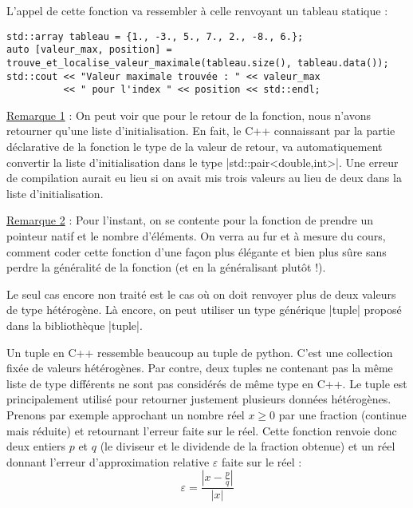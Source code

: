 \begin{itemize}
L'appel de cette fonction va ressembler à celle renvoyant un tableau statique :
\begin{lstlisting}
std::array tableau = {1., -3., 5., 7., 2., -8., 6.};
auto [valeur_max, position] = trouve_et_localise_valeur_maximale(tableau.size(), tableau.data());
std::cout << "Valeur maximale trouvée : " << valeur_max 
          << " pour l'index " << position << std::endl;
\end{lstlisting}

\underline{Remarque 1} : On peut voir que pour le retour de la fonction, nous n'avons retourner qu'une 
liste d'initialisation. En fait, le C++ connaissant par la partie déclarative de la fonction le type
de la valeur de retour, va automatiquement convertir la liste d'initialisation dans le type 
|std::pair<double,int>|. Une erreur de compilation aurait eu lieu si on avait mis trois valeurs au lieu
de deux dans la liste d'initialisation.

\underline{Remarque 2} : Pour l'instant, on se contente pour la fonction de prendre un pointeur natif
et le nombre d'éléments. On verra au fur et à mesure du cours, comment coder cette fonction d'une façon
plus élégante et bien plus sûre sans perdre la généralité de la fonction (et en la généralisant plutôt !).

Le seul cas encore non traité est le cas où on doit renvoyer plus de deux valeurs de type hétérogène.
Là encore, on peut utiliser un type générique |tuple| proposé dans la bibliothèque |tuple|.

Un tuple en C++ ressemble beaucoup au tuple de python. C'est une collection fixée de valeurs hétérogènes.
Par contre, deux tuples ne contenant pas la même liste de type différents ne sont pas considérés de même type en C++. Le tuple est principalement utilisé pour retourner justement plusieurs données hétérogènes. Prenons par exemple approchant un nombre réel $x\geq 0$ par une fraction (continue mais réduite) et retournant l'erreur faite sur le réel. Cette fonction renvoie donc deux entiers $p$ et $q$  (le diviseur et le dividende de la fraction obtenue) et un réel donnant l'erreur d'approximation relative $\varepsilon$ faite sur le réel :
\[
\varepsilon = \frac{|x - \frac{p}{q}|}{|x|}
\]


\end{itemize}
